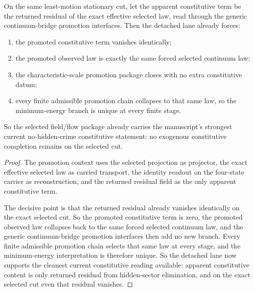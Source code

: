 \begin{theorem}
\label{thm:the-selected-field-flow-package-admits-no-exogenous-constitutive-completion}
On the same least-motion stationary cut, let the apparent constitutive term be
the returned residual of the exact effective selected law, read through the
generic continuum-bridge promotion interfaces. Then the detached lane already forces:
\begin{enumerate}
\item the promoted constitutive term vanishes identically;
\item the promoted observed law is exactly the same forced selected continuum
      law;
\item the characteristic-scale promotion package closes with no extra
      constitutive datum;
\item every finite admissible promotion chain collapses to that same law, so
      the minimum-energy branch is unique at every finite stage.
\end{enumerate}
So the selected field/flow package already carries the manuscript's strongest
current no-hidden-crime constitutive statement: no exogenous constitutive
completion remains on the selected cut.
\end{theorem}

\begin{proof}
The promotion context uses the selected projection as projector, the exact
effective selected law as carried transport, the identity readout on the
four-state carrier as reconstruction, and the returned residual field as the
only apparent constitutive term.

The decisive point is that the returned residual already vanishes identically
on the exact selected cut. So the promoted constitutive term is zero, the
promoted observed law collapses back to the same forced selected continuum
law, and the generic continuum-bridge promotion interfaces then add no new branch.
Every finite admissible promotion chain selects that same law at every stage,
and the minimum-energy interpretation is therefore unique. So the detached
lane now supports the cleanest current constitutive reading available:
apparent constitutive content is only returned residual from hidden-sector
elimination, and on the exact selected cut even that residual vanishes.
\end{proof}

